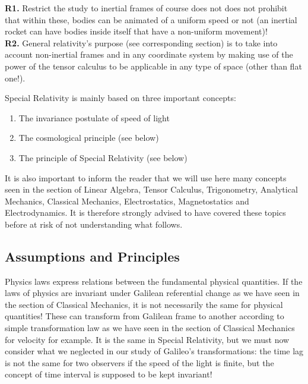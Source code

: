 	\begin{tcolorbox}[title=Remarks,colframe=black,arc=10pt]
	\textbf{R1.} Restrict the study to inertial frames of course does not does not prohibit that within these, bodies can be animated of a uniform speed or not (an inertial rocket can have bodies inside itself that have a non-uniform movement)!\\
	
	\textbf{R2.} General relativity's purpose (see corresponding section) is to take into account non-inertial frames and in any coordinate system by making use of the power of the tensor calculus to be applicable in any type of space (other than flat one!).
	\end{tcolorbox}	
	Special Relativity is mainly based on three important concepts:
	\begin{enumerate}
		\item The invariance postulate of speed of light
		\item The cosmological principle (see below)
		\item The principle of Special Relativity (see below)
	\end{enumerate}
	It is also important to inform the reader that we will use here many concepts seen in the section of Linear Algebra, Tensor Calculus, Trigonometry, Analytical Mechanics, Classical Mechanics, Electrostatics, Magnetostatics and Electrodynamics. It is therefore strongly advised to have covered these topics before at risk of not understanding what follows.
	
	\subsection{Assumptions and Principles}
	Physics laws express relations between the fundamental physical quantities. If the laws of physics are invariant under Galilean referential change as we have seen in the section of Classical Mechanics, it is not necessarily the same for physical quantities! These can transform from Galilean frame to another according to  simple transformation law as we have seen in the section of Classical Mechanics for velocity for example. It is the same in Special Relativity, but we must now consider what we neglected in our study of Galileo's transformations: the time lag is not the same for two observers if the speed of the light is finite, but the concept of time interval is supposed to be kept invariant!
	
